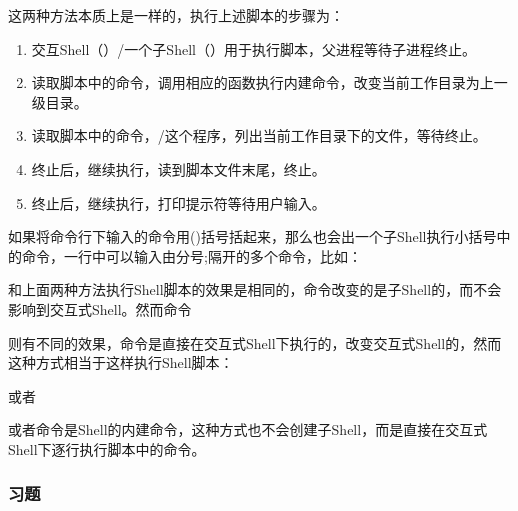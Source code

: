 这两种方法本质上是一样的，执行上述脚本的步骤为：



\begin{enumerate}

\item 交互Shell（）/一个子Shell（）用于执行脚本，父进程等待子进程终止。

\item {}读取脚本中的命令，调用相应的函数执行内建命令，改变当前工作目录为上一级目录。

\item {}读取脚本中的命令，/这个程序，列出当前工作目录下的文件，等待终止。

\item {}终止后，继续执行，读到脚本文件末尾，终止。

\item {}终止后，继续执行，打印提示符等待用户输入。
\end{enumerate}


如果将命令行下输入的命令用()括号括起来，那么也会出一个子Shell执行小括号中的命令，一行中可以输入由分号;隔开的多个命令，比如：




和上面两种方法执行Shell脚本的效果是相同的，命令改变的是子Shell的，而不会影响到交互式Shell。然而命令




则有不同的效果，命令是直接在交互式Shell下执行的，改变交互式Shell的，然而这种方式相当于这样执行Shell脚本：




或者




或者命令是Shell的内建命令，这种方式也不会创建子Shell，而是直接在交互式Shell下逐行执行脚本中的命令。


\subsubsection*{习题}
%


